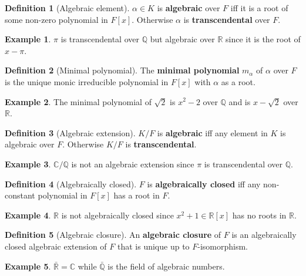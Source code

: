 \documentclass{article}
\newcommand{\Q}{\mathbb{Q}}
\newcommand{\R}{\mathbb{R}}
\newcommand{\C}{\mathbb{C}}
\renewcommand{\sb}[1]{\left[ #1 \right]}
\theoremstyle{definition}\newtheorem*{definition}{Definition}
\theoremstyle{definition}\newtheorem*{example}{Example}
\theoremstyle{definition}\newtheorem*{remark}{Remark}
\begin{document}
\begin{definition}[Algebraic element]
$ \alpha \in K $ is \textbf{algebraic} over $ F $ iff it is a root of some non-zero polynomial in $ F\sb{x} $. Otherwise $ \alpha $ is \textbf{transcendental} over $ F $.
\end{definition}

\begin{example}
$ \pi $ is transcendental over $ \Q $ but algebraic over $ \R $ since it is the root of $ x - \pi $.
\end{example}

\begin{definition}[Minimal polynomial]
The \textbf{minimal polynomial} $ m_\alpha $ of $ \alpha $ over $ F $ is the unique monic irreducible polynomial in $ F\sb{x} $ with $ \alpha $ as a root.
\end{definition}

\begin{example}
The minimal polynomial of $ \sqrt{2} $ is $ x^2 - 2 $ over $ \Q $ and is $ x - \sqrt{2} $ over $ \R $.
\end{example}

\begin{definition}[Algebraic extension]
$ K / F $ is \textbf{algebraic} iff any element in $ K $ is algebraic over $ F $. Otherwise $ K / F $ is \textbf{transcendental}.
\end{definition}

\begin{example}
$ \C / \Q $ is not an algebraic extension since $ \pi $ is transcendental over $ \Q $.
\end{example}

\begin{definition}[Algebraically closed]
$ F $ is \textbf{algebraically closed} iff any non-constant polynomial in $ F\sb{x} $ has a root in $ F $.
\end{definition}

\begin{example}
$ \R $ is not algebraically closed since $ x^2 + 1 \in \R\sb{x} $ has no roots in $ \R $.
\end{example}

\begin{definition}[Algebraic closure]
An \textbf{algebraic closure} of $ F $ is an algebraically closed algebraic extension of $ F $ that is unique up to $ F $-isomorphism.
\end{definition}

\begin{example}
$ \bar{\R} = \C $ while $ \bar{\Q} $ is the field of algebraic numbers.
\end{example}
\end{document}
